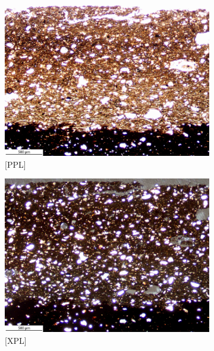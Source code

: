 \documentclass[a4paper]{article}
\begin{document}
\begin{figure}[H]
	\centering
	\begin{subfigure}[t]{.49\textwidth}
		\includegraphics[width=\textwidth]{ThinSections/102-1_4x_PPL.jpg}
		\caption{[PPL]}
	\end{subfigure}\hspace{.5em}\hfill
	\begin{subfigure}[t]{.49\textwidth}
		\includegraphics[width=\textwidth]{ThinSections/102-1_4x_XPL.jpg}
		\caption{[XPL]}
	\end{subfigure}
	\begin{subfigure}[t]{.49\textwidth}

\end{subfigure}
\end{figure}
\end{document}
